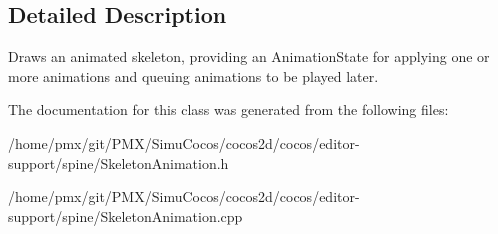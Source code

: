 \subsection{Detailed Description}
Draws an animated skeleton, providing an Animation\+State for applying one or more animations and queuing animations to be played later. 

The documentation for this class was generated from the following files\+:\begin{DoxyCompactItemize}
\item 
/home/pmx/git/\+P\+M\+X/\+Simu\+Cocos/cocos2d/cocos/editor-\/support/spine/Skeleton\+Animation.\+h\item 
/home/pmx/git/\+P\+M\+X/\+Simu\+Cocos/cocos2d/cocos/editor-\/support/spine/Skeleton\+Animation.\+cpp\end{DoxyCompactItemize}
